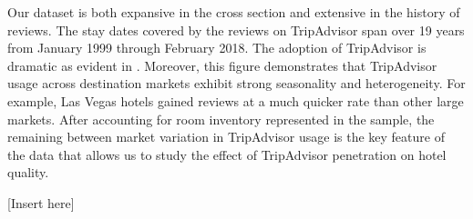 \documentclass[12pt, leqno]{article}
\begin{document}
Our dataset is both expansive in the cross section and extensive in the history of reviews. The stay dates covered by the reviews on TripAdvisor span over 19 years from January 1999 through February 2018. The adoption of TripAdvisor is dramatic as evident in . Moreover, this figure demonstrates that TripAdvisor usage across destination markets exhibit strong seasonality and heterogeneity. For example, Las Vegas hotels gained reviews at a much quicker rate than other large markets. After accounting for room inventory represented in the sample, the remaining between market variation in TripAdvisor usage is the key feature of the data that allows us to study the effect of TripAdvisor penetration on hotel quality. 

[Insert  here]


\end{document}
